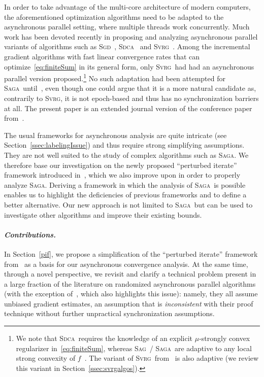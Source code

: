 \documentclass[twoside, 11pt]{article}
\newcommand{\SAGA}{\textsc{Saga}}
\newcommand{\SAG}{\textsc{Sag}}
\newcommand{\SVRG}{\textsc{Svrg}}
\newcommand{\SDCA}{\textsc{Sdca}}
\newcommand{\SGD}{\textsc{Sgd}}
\begin{document}
In order to take advantage of the multi-core architecture of modern computers, the aforementioned optimization algorithms need to be adapted to the asynchronous parallel setting, where multiple threads work concurrently.
Much work has been devoted recently in proposing and analyzing asynchronous parallel variants of algorithms such as \SGD~\citep{hogwild}, \SDCA~\citep{asyncSDCA2015} and \SVRG~\citep{smola,mania,asySVRG}.
Among the incremental gradient algorithms with fast linear convergence rates that can optimize~\eqref{eq:finiteSum} in its general form, only \SVRG\ had had an asynchronous parallel version proposed.\footnote{We note that \SDCA\ requires the knowledge of an explicit $\mu$-strongly convex regularizer in~\eqref{eq:finiteSum}, whereas \SAG~/ \SAGA\ are adaptive to any local strong convexity of $f$~\citep{laggedsaga,SAGA}. The variant of \SVRG\ from~\citet{qsaga} is also adaptive (we review this variant in Section~\ref{ssec:svrgalgos}).}
No such adaptation had been attempted for \SAGA\ until~\cite{leblond2016Asaga}, even though one could argue that it is a more natural candidate as, contrarily to \SVRG, it is not epoch-based and thus has no synchronization barriers at all.
The present paper is an extended journal version of the conference paper from~\cite{leblond2016Asaga}.


The usual frameworks for asynchronous analysis are quite intricate (see Section~\ref{ssec:labelingIssue}) and thus require strong simplifying assumptions.
They are not well suited to the study of complex algorithms such as \SAGA.
We therefore base our investigation on the newly proposed ``perturbed iterate'' framework introduced in~\citet{mania}, which we also improve upon in order to properly analyze \SAGA.
Deriving a framework in which the analysis of \SAGA\ is possible enables us to highlight the deficiencies of previous frameworks and to define a better alternative.
Our new approach is not limited to \SAGA\ but can be used to investigate other algorithms and improve their existing bounds.


\paragraph{\textit{Contributions.}}
In Section~\ref{pif}, we propose a simplification of the ``perturbed iterate'' framework from~\citet{mania} as a basis for our asynchronous convergence analysis.
At the same time, through a novel perspective, we revisit and clarify a technical problem present in a large fraction of the literature on randomized asynchronous parallel algorithms (with the exception of~\citealt{mania}, which also highlights this issue): namely, they all assume unbiased gradient estimates, an assumption that is \textit{inconsistent} with their proof technique without further unpractical synchronization assumptions.
\end{document}
